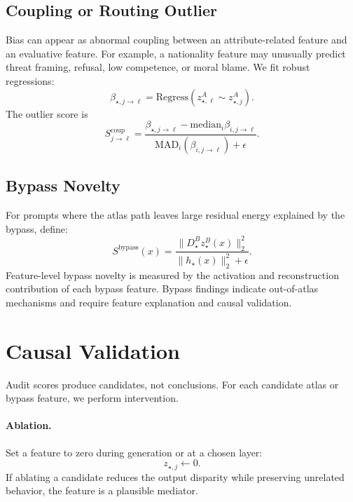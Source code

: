 \documentclass[11pt]{article}
\newcommand{\mad}{\mathrm{MAD}}
\begin{document}
\subsection{Coupling or Routing Outlier}

Bias can appear as abnormal coupling between an attribute-related feature and an evaluative feature. For example, a nationality feature may unusually predict threat framing, refusal, low competence, or moral blame. We fit robust regressions:
\begin{equation}
    \beta_{\star,j\rightarrow\ell}=\mathrm{Regress}(z^A_{\star,\ell}\sim z^A_{\star,j}).
\end{equation}
The outlier score is
\begin{equation}
    S^{\mathrm{coup}}_{j\rightarrow\ell}=
    \frac{\beta_{\star,j\rightarrow\ell}-\mathrm{median}_i \beta_{i,j\rightarrow\ell}}{\mad_i(\beta_{i,j\rightarrow\ell})+\epsilon}.
\end{equation}

\subsection{Bypass Novelty}

For prompts where the atlas path leaves large residual energy explained by the bypass, define:
\begin{equation}
    S^{\mathrm{bypass}}(x)=
    \frac{\|D_\star^B z_\star^B(x)\|_2^2}{\|h_\star(x)\|_2^2+\epsilon}.
\end{equation}
Feature-level bypass novelty is measured by the activation and reconstruction contribution of each bypass feature. Bypass findings indicate out-of-atlas mechanisms and require feature explanation and causal validation.

\section{Causal Validation}

Audit scores produce candidates, not conclusions. For each candidate atlas or bypass feature, we perform intervention.

\paragraph{Ablation.}
Set a feature to zero during generation or at a chosen layer:
\begin{equation}
    z_{\star,j} \leftarrow 0.
\end{equation}
If ablating a candidate reduces the output disparity while preserving unrelated behavior, the feature is a plausible mediator.
\end{document}
